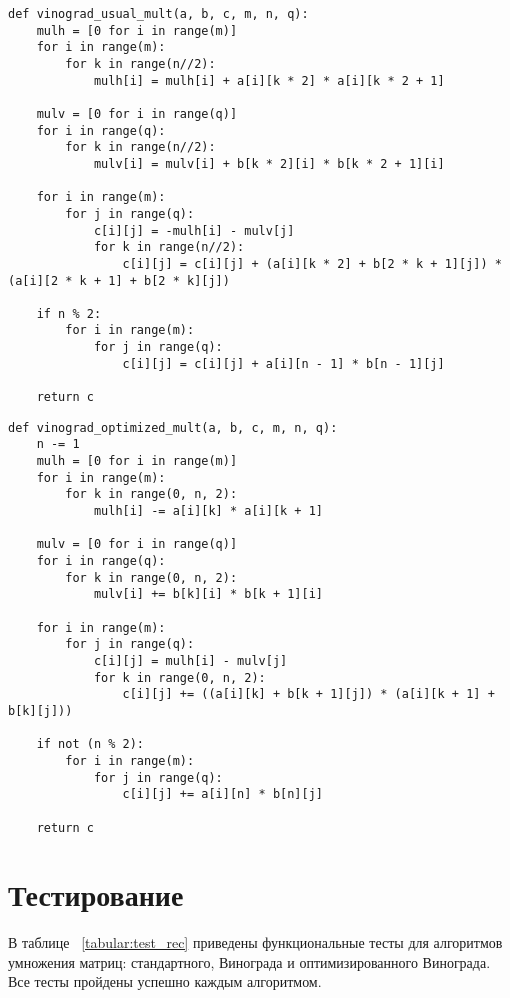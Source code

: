 \begin{lstlisting}[caption=Алгоритм умножения матриц Винограда,
	label={vin}]
def vinograd_usual_mult(a, b, c, m, n, q):
	mulh = [0 for i in range(m)]
	for i in range(m):
		for k in range(n//2):
			mulh[i] = mulh[i] + a[i][k * 2] * a[i][k * 2 + 1]
	
	mulv = [0 for i in range(q)]
	for i in range(q):
		for k in range(n//2):
			mulv[i] = mulv[i] + b[k * 2][i] * b[k * 2 + 1][i]
	
	for i in range(m):
		for j in range(q):
			c[i][j] = -mulh[i] - mulv[j]
			for k in range(n//2):
				c[i][j] = c[i][j] + (a[i][k * 2] + b[2 * k + 1][j]) * (a[i][2 * k + 1] + b[2 * k][j])
	
	if n % 2:
		for i in range(m):
			for j in range(q):
				c[i][j] = c[i][j] + a[i][n - 1] * b[n - 1][j]
	
	return c
\end{lstlisting}

\begin{lstlisting}[caption=Оптимизированный алгоритм умножения матриц Винограда,
	label={vin_opt}]
def vinograd_optimized_mult(a, b, c, m, n, q):
	n -= 1
	mulh = [0 for i in range(m)]
	for i in range(m):
		for k in range(0, n, 2):
			mulh[i] -= a[i][k] * a[i][k + 1]
	
	mulv = [0 for i in range(q)]
	for i in range(q):
		for k in range(0, n, 2):
			mulv[i] += b[k][i] * b[k + 1][i]
	
	for i in range(m):
		for j in range(q):
			c[i][j] = mulh[i] - mulv[j]
			for k in range(0, n, 2):
				c[i][j] += ((a[i][k] + b[k + 1][j]) * (a[i][k + 1] + b[k][j]))
	
	if not (n % 2):
		for i in range(m):
			for j in range(q):
				c[i][j] += a[i][n] * b[n][j]
	
	return c
\end{lstlisting}



\section{Тестирование}
В таблице ~\ref{tabular:test_rec} приведены функциональные тесты для алгоритмов умножения матриц: стандартного, Винограда и оптимизированного Винограда. Все тесты пройдены успешно каждым алгоритмом.

